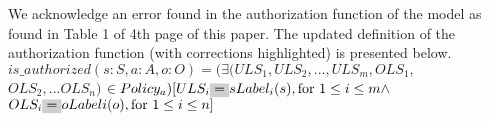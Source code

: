 We acknowledge an error found in the authorization function of the  \EPMNModel{} model as found in Table 1  of 4th page of this paper. The updated definition of the authorization function (with corrections highlighted) is presented below. \\

$is\_authorized(s:S, a:A, o:O) = (\exists (ULS_1,ULS_2, ..., ULS_m, OLS_1,$ \\$ OLS_2, ... OLS_n ) $ 
$ \in Policy_a)[ULS_i \highlight{=} sLabel_i(s), \text{for } 1 \le i \le m \land$  \\ \hfill $ \OLS{i} \highlight{=} oLabel{i}(o), \text{for } 1 \le i \le n]$ 